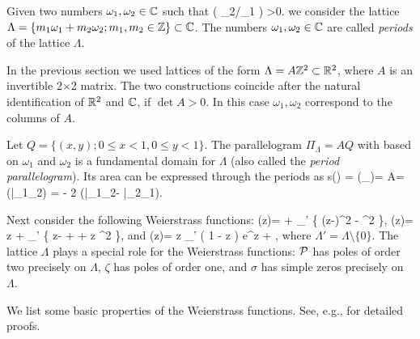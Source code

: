 \documentclass[12pt]{amsart}
\begin{document}
 
 
 Given two numbers   $\omega_1, \omega_2 \in \mathbb{C} $ such that 
  \beq
 \label{positive}
 \Im  \Big (  \omega_2/\omega_1 \Big ) >0.
 \eeq
 we consider the  lattice $\Lambda=\{m_1\omega_1+m_2\omega_2; m_1,m_2 \in
 \mathbb{Z}\}\subset \mathbb{C}$. The numbers    $\omega_1, \omega_2 \in \mathbb{C} $ are
 called {\em periods }  of the lattice $\Lambda$. 
 
   In the previous section we used   lattices of  the form
 $\Lambda = A \mathbb{Z}^2 \subset \mathbb{R}^2$, where $A$ is an invertible 2$\times$2 matrix.
   The  two constructions coincide after the natural identification of  
$\mathbb{R}^2$ and $\mathbb{C} $,  if  $\det A >0$. In this case    $\omega_1, \omega_2$
correspond to the columns of  $A$.  

Let $Q=\{(x,y); 0\leq x <1, 0\leq
y <1\}$. 
The parallelogram $\Pi _\Lambda = AQ$ with based on 
$\omega_1$ and $\omega_2$ is a fundamental domain  for  $\Lambda$
(also called the {\em period    parallelogram}).  
 Its area can be  expressed through the periods as 
\beq \label{area}
s(\Lambda ) = (\Pi _\Lambda)= \det A=  \Im (\bar {\omega}_1\omega_2)
= - 2 (\bar{\omega}_1\omega_2- \bar{\omega}_2\omega_1).
  \eeq
 

  
Next  consider the following Weierstrass functions:
 \beq
 \label{Pfunction}
\cP(z)=  + \sum_{\omega \in \Lambda'}   \left \{
       {(z-\omega)^2} -  {\omega^2}  \right \},
\eeq
\beq 
\label{zeta}
\zeta(z)=  z + \sum_{\omega \in \Lambda'} 
     \left \{  {z-\omega} +  \omega + \frac z {\omega^2 } \right \},
\eeq
and
\beq
\label{sigma}
\sigma(z)= z \prod_{\omega \in \Lambda'}  \left ( 1 - \frac z \omega \right )
    e^{\frac z \omega + },
\eeq
where  $\Lambda'= \Lambda \setminus \{0\}$. The lattice  
$\Lambda$ plays a special role for the Weierstrass functions: $\mathcal{P}$  has poles
of order two precisely on $\Lambda $,  $\zeta$ has  poles
of order one, and  $\sigma$ has simple zeros precisely on $\Lambda $.



We list some  basic properties of the Weierstrass  functions. See,
e.g.,  \cite{Ahiezer} for detailed proofs. 
\end{document}
